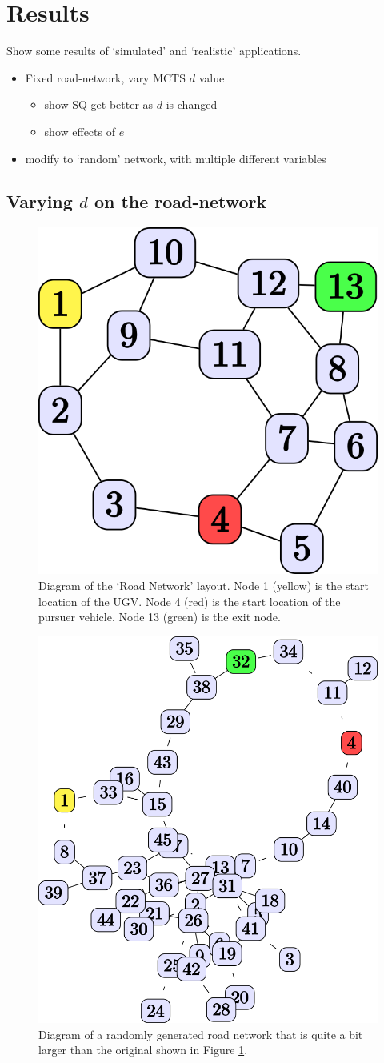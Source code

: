 \section{Results}
Show some results of `simulated' and `realistic' applications.

\begin{itemize}
    \item Fixed road-network, vary MCTS $d$ value
    \begin{itemize}
        \item show SQ get better as $d$ is changed 
        \item show effects of $e$
    \end{itemize}
    \item modify to `random' network, with multiple different variables
\end{itemize}

\subsection{Varying $d$ on the road-network}

\begin{figure}[tbp]
    \centering
    \includegraphics[width=0.4\linewidth]{Figures/original_roadnet.png}
    \caption{Diagram of the `Road Network' layout. Node 1 (yellow) is the start location of the UGV. Node 4 (red) is the start location of the pursuer vehicle. Node 13 (green) is the exit node.}
    \label{fig:roadnet}
\end{figure}
\begin{figure}[tbp]
    \centering
    \includegraphics[width=0.4\linewidth]{Figures/medium_roadnet.png}
    \caption{Diagram of a randomly generated road network that is quite a bit larger than the original shown in Figure \ref{fig:roadnet}.}
    \label{fig:med_roadnet}
\end{figure}

